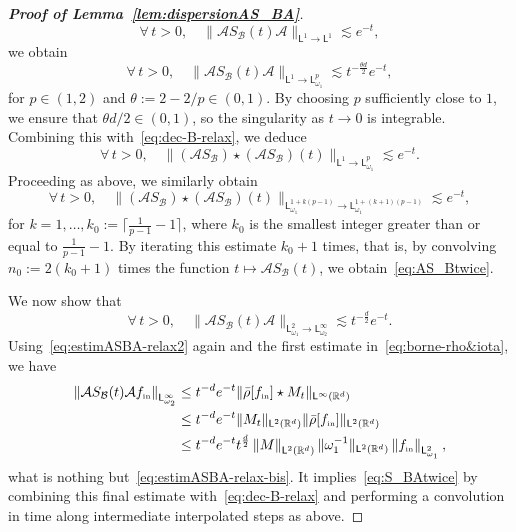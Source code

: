 \documentclass[11pt]{amsart}
\theoremstyle{definition}
\theoremstyle{remark}
\numberwithin{equation}{section}
\newcommand\R{{\mathbb R}}
\def\AA{{\mathcal A}}
\def\BB{{\mathcal B}}
\newcommand{\init}{\text{{\tiny {\rm in}}}}
\newcommand{\sfL}{\mathsf{L}}
\begin{document}
\begin{proof}[{\bf Proof of Lemma~\ref{lem:dispersionAS_BA}}]
  \[
    \forall\, t > 0,\quad \big\| \AA S_\BB(t) \AA \big\|_{\sfL^1 \to \sfL^1} \lesssim e^{-t}, 
  \]
  we obtain
  \[
    \forall\, t > 0,\quad \big\| \AA S_\BB(t) \AA \big\|_{\sfL^1 \to \sfL_{\omega_1}^p} \lesssim t^{-\frac{\theta d}{2}} e^{-t},
  \]
  for $p \in (1,2)$ and $\theta := 2- 2/p \in (0,1)$. By choosing $p$ sufficiently close to $1$, we ensure that $\theta d/2 \in (0,1)$, so the singularity as $t \to 0$ is integrable. Combining this with~\eqref{eq:dec-B-relax}, we deduce
  \[
    \forall\, t > 0,\quad \big\| (\AA S_\BB) \star (\AA S_\BB)(t) \big\|_{\sfL^1 \to \sfL_{\omega_1}^p} \lesssim e^{-t}.
  \]
  Proceeding as above, we similarly obtain
  \[
    \forall\, t > 0,\quad \big\| (\AA S_\BB) \star (\AA S_\BB)(t) \big\|_{\sfL_{\omega_1}^{1 + k(p-1)} \to \sfL_{\omega_1}^{1 + (k+1)(p-1)}} \lesssim e^{-t},
  \]
  for $k = 1, \dots, k_0 := \lceil \frac{1}{p-1} - 1 \rceil$, where $k_0$ is the smallest integer greater than or equal to $\frac{1}{p-1} - 1$. By iterating this estimate $k_0 + 1$ times, that is, by convolving $n_0 := 2(k_0 + 1)$ times the function $t \mapsto \AA S_\BB(t)$, we obtain~\eqref{eq:AS_Btwice}.

  \smallskip
  We now show that
  \begin{equation}
    \label{eq:estimASBA-relax-bis}
    \forall \, t > 0, \quad \big\| \AA S_\BB(t) \AA \big\|_{\sfL^2_{\omega_1}  \to \sfL_{\omega_2}^\infty} \lesssim t^{-\frac{d}{2}}e^{-t}.
  \end{equation}
  Using~\eqref{eq:estimASBA-relax2} again and the first estimate in~\eqref{eq:borne-rho&iota}, we have
  \begin{align*}
    \left\Vert \AA S_\BB(t) \AA f_\init \right\Vert_{\sfL_{\omega_2}^\infty}
    &\leq t^{-d}e^{-t} \| \bar\rho[f_\init] \star M_t \|_{\sfL^\infty(\R^d)}  \\
    &\leq t^{-d}e^{-t}  \| M_t \|_{\sfL^2(\R^d)} \| \bar\rho[f_\init]  \|_{\sfL^2(\R^d)}  \\
    &\leq t^{-d}e^{-t} t^{\frac{d}{2}}   \left\Vert M \right\Vert_{\sfL^2(\R^d)} \| \omega_1^{-1} \|_{\sfL^2(\R^d)} \left\Vert f_\init \right\Vert_{\sfL^2_{\omega_1}},
  \end{align*}
  what is nothing but~\eqref{eq:estimASBA-relax-bis}. It implies~\eqref{eq:S_BAtwice} by combining this final estimate with~\eqref{eq:dec-B-relax} and performing a convolution in time along intermediate interpolated steps as above. 
\end{proof}
\end{document}
